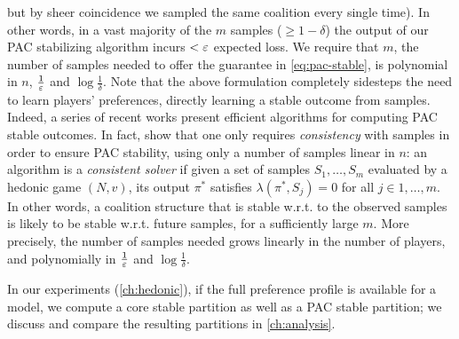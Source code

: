 but by sheer coincidence we sampled the same coalition every single time).
In other words, in a vast majority of the $m$ samples ($\ge 1 - \delta$) the output
of our PAC stabilizing algorithm incurs $< \varepsilon$ expected loss.
We require that $m$, the number of samples needed to offer the guarantee in
\eqref{eq:pac-stable}, is polynomial in $n$, $\frac1{\varepsilon}$ and $\log\frac1\delta$.
Note that the above formulation completely sidesteps the need to learn players'
preferences, directly learning a stable outcome from samples.
Indeed, a series of recent works \cite{ijcai2017-380,igarashi2019learning,jha2019learning}
present efficient algorithms for computing PAC stable outcomes.
In fact,  show that one only requires {\em consistency}
with samples in order to ensure PAC stability, using only a number of samples
linear in $n$: an algorithm is a {\em consistent solver} if given a set of samples
$S_1,\dots,S_m$ evaluated by a hedonic game $(N,v)$, its output $\pi^*$ satisfies
$\lambda(\pi^*,S_j) =0$ for all $j \in 1,\dots,m$.
In other words, a coalition structure that is stable w.r.t. to the observed
samples is likely to be stable w.r.t. future samples, for a sufficiently large $m$.
More precisely, the number of samples needed grows linearly in the number of
players, and polynomially in $\frac1{\varepsilon}$ and $\log\frac1\delta$.

In our experiments (\autoref{ch:hedonic}), if the full preference profile is
available for a model, we compute a core stable partition as well as a PAC
stable partition; we discuss and compare the resulting partitions in
\autoref{ch:analysis}.

